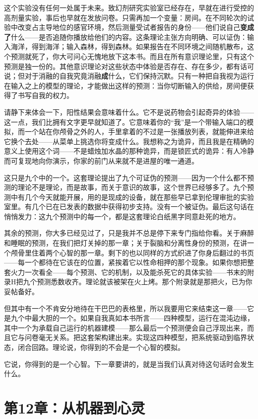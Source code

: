 \documentclass[11pt, twoside, openright]{book}
\begin{document}
这个实验没有任何一处属于未来。致幻剂研究实验室已经存在，早就在进行受控的高剂量实验，事后也早就在发放问卷。只需再加一个变量：房间。在不同轮次的试验中改变占主导地位的感官环境，然后测量受试者报告的身份------他们说自己\textbf{变成了}什么------是否追随你播放给他们的内容。这条理论主张方向明确、可以证伪：输入海洋，得到海洋；输入森林，得到森林。如果报告在不同环境之间随机散布，这个预测就死了，你大可问心无愧地放下这本书。而且在所有意识理论里，只有这个预测是独一份的。其他意识理论对这些状态中体验是否存在、存在多少，都有话可说；但对于消融的自我究竟消融\textbf{成}什么，它们保持沉默。只有一种把自我视为运行在输入之上的模型的理论，才能做出这样的预测：当你切断输入的供给，房间便获得了书写自我的权力。

请静下来体会一下，阳性结果会意味着什么。它不是说药物会引起奇异的体验------这一点，我们比拥有文字更早就知道了。它意味着你的“我”是一个带输入端口的模拟，而一个站在你颅骨之外的人，手里拿着的不过是一张播放列表，就能伸进来给它换个去处------从菜单上挑选你将变成什么。我想称之为诡异，而且我是在精确的意义上使用这个词------不是蜡烛加水晶的那种诡异，而是锁匠式的诡异：有人冷静而可复现地向你演示，你家的前门从来就不是进屋的唯一通道。

这只是九个中的一个。这套理论提出了九个可证伪的预测------因为一个什么都不预测的理论不是理论，而是故事，而关于意识的故事，这个世界已经够多了。九个预测中有几个今天就能开展，用的是现成的设备，就在那些早已拿到伦理审批的实验室里。有几个已在已发表的数据中获得初步支持。没有一个被证伪。最后这句话在悄悄发力：这九个预测中的每一个，都是这套理论白纸黑字同意赴死的地方。

其余的预测，你大多已经见过了，只是我并不总是停下来专门指给你看。关于麻醉和睡眠的预测，在我们把灯关掉的那一章；关于裂脑和分离性身份的预测，在讲一个颅骨里住着两个心智的那一章。剩下的也以同样的方式织进了你身后翻过的书页------每一个都待在它该在的位置，紧挨着它以性命相押的那个现象。如果你想把整套火力一次看全------每个预测、它的机制，以及能杀死它的具体实验------书末的附录H把九个预测悉数收齐。理论就该被架在火上烤。那个附录就是那把火，已为你妥帖备好。

但其中有一个不肯安分地待在干巴巴的表格里，所以我要用它来结束这一章------它是九个中最大胆的一个。如果自我真如本书所言------四种模型，运行在混沌边缘，其中一个为承载自己运行的机器建模------那么最后一个预测便会自己浮现出来，而且它与问卷毫无关系。把这套架构建出来。实现这四种模型，把系统驱动到临界状态，闭合回路。理论说，你得到的不会是一个心智的模拟。

它说，你得到的是一个心智。下一章要讲的，就是当我们认真对待这句话时会发生什么。


\chapter*{第12章：从机器到心灵}
\end{document}
